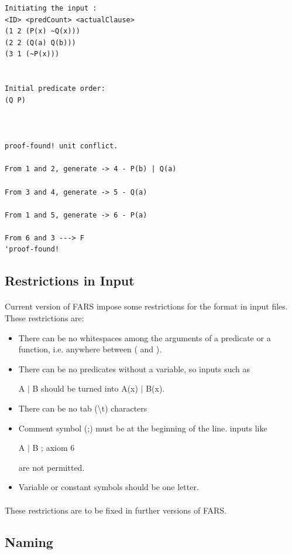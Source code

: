 \documentclass[11pt]{report}
\begin{document}
\begin{lstlisting}
Initiating the input : 
<ID> <predCount> <actualClause>
(1 2 (P(x) ~Q(x)))
(2 2 (Q(a) Q(b)))
(3 1 (~P(x)))


Initial predicate order: 
(Q P)



proof-found! unit conflict.

From 1 and 2, generate -> 4 - P(b) | Q(a)

From 3 and 4, generate -> 5 - Q(a)

From 1 and 5, generate -> 6 - P(a)

From 6 and 3 ---> F
'proof-found!
\end{lstlisting}

\subsection{Restrictions in Input}

\paragraph{} Current version of FARS impose some restrictions for the format in input files. These restrictions are:

\begin{itemize}
 \item There can be no whitespaces among the arguments of a predicate or a function, i.e. anywhere between ( and ).
 \item There can be no predicates without a variable, so inputs such as 

A $|$ B should be turned into A(x) $|$ B(x).
 \item There can be no tab (\textbackslash t) characters
 \item Comment symbol (;) must be at the beginning of the line. inputs like 

A $|$ B ; axiom 6

are not permitted.
 \item Variable or constant symbols should be one letter. 
\end{itemize}

\paragraph{} These restrictions are to be fixed in further versions of FARS.


\subsection{Naming}
\end{document}

